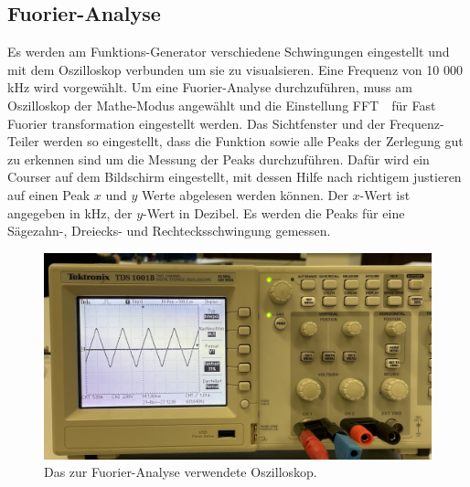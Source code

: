 \subsection{Fuorier-Analyse}
Es werden am Funktions-Generator verschiedene Schwingungen eingestellt und mit dem Oszilloskop verbunden um sie zu 
visualsieren. Eine Frequenz von 10 000\,kHz wird vorgewählt. Um eine Fuorier-Analyse durchzuführen, muss am Oszilloskop
der Mathe-Modus angewählt und die Einstellung \glqq FFT \grqq\,\, für \glqq Fast Fuorier transformation\grqq \,\,eingestellt werden. Das Sichtfenster 
und der Frequenz-Teiler werden so eingestellt, dass die Funktion sowie alle Peaks der Zerlegung gut zu erkennen sind um die Messung der Peaks
durchzuführen. Dafür wird ein Courser auf dem Bildschirm eingestellt, mit dessen Hilfe nach richtigem justieren auf einen Peak
$x$ und $y$ Werte abgelesen werden können. Der $x$-Wert ist angegeben in kHz, der $y$-Wert in Dezibel. Es werden die Peaks für eine Sägezahn-,
Dreiecks- und Rechtecksschwingung gemessen.
\begin{figure}[H]
    \centering
    \includegraphics[scale=0.1]{Messdaten_Bilder/Oszilloskop.jpeg}
    \caption{Das zur Fuorier-Analyse verwendete Oszilloskop.}
    \label{fig:Oszilloskop}
\end{figure}